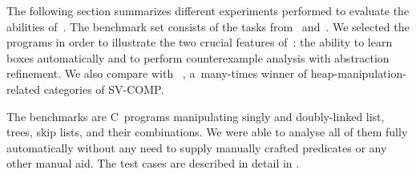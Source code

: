 {The following section summarizes different experiments performed to evaluate
the abilities of~\forester{}.
The benchmark set consists of the tasks from~\cite{boxes13} and~\cite{vmcai17}.
We selected the programs in order to illustrate the two crucial features
of~\forester: the ability to learn boxes
automatically and to perform counterexample analysis with abstraction refinement.
We also compare \forester with \predator~\cite{predator11,dudka13sas}, a~many-times winner of
heap-manipulation-related categories of SV-COMP.

The benchmarks are C~programs manipulating singly and doubly-linked list, trees, skip lists, and their combinations.
We were able to analyse all of them fully automatically without any need to supply
manually crafted predicates or any other manual aid. The test cases are described in
detail in .



}
